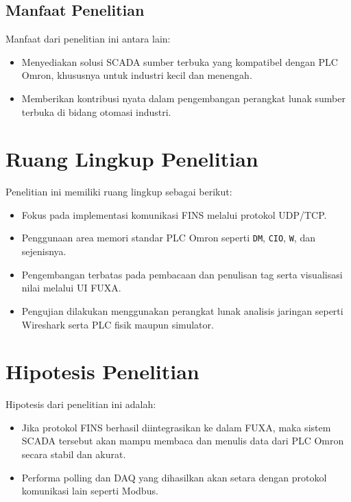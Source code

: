 \subsection{Manfaat Penelitian}
Manfaat dari penelitian ini antara lain:
\begin{itemize}
    \item Menyediakan solusi SCADA sumber terbuka yang kompatibel dengan PLC Omron, khususnya untuk industri kecil dan menengah.
    \item Memberikan kontribusi nyata dalam pengembangan perangkat lunak sumber terbuka di bidang otomasi industri.
\end{itemize}

\section{Ruang Lingkup Penelitian}
Penelitian ini memiliki ruang lingkup sebagai berikut:
\begin{itemize}
    \item Fokus pada implementasi komunikasi FINS melalui protokol UDP/TCP.
    \item Penggunaan area memori standar PLC Omron seperti \texttt{DM}, \texttt{CIO}, \texttt{W}, dan sejenisnya.
    \item Pengembangan terbatas pada pembacaan dan penulisan tag serta visualisasi nilai melalui UI FUXA.
    \item Pengujian dilakukan menggunakan perangkat lunak analisis jaringan seperti Wireshark serta PLC fisik maupun simulator.
\end{itemize}

\section{Hipotesis Penelitian}
Hipotesis dari penelitian ini adalah:
\begin{itemize}
    \item Jika protokol FINS berhasil diintegrasikan ke dalam FUXA, maka sistem SCADA tersebut akan mampu membaca dan menulis data dari PLC Omron secara stabil dan akurat.
    \item Performa polling dan DAQ yang dihasilkan akan setara dengan protokol komunikasi lain seperti Modbus.
\end{itemize}

